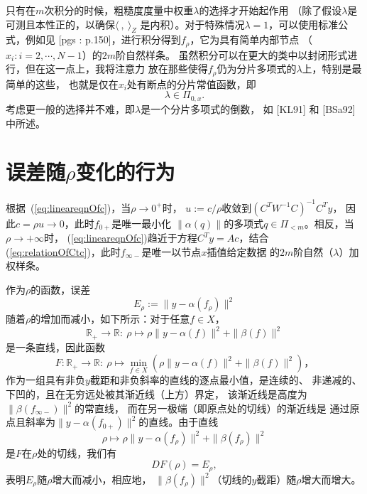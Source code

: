 只有在$m$次积分的时候，粗糙度度量中权重$\lambda$的选择才开始起作用
（除了假设$\lambda$是可测且本性正的，以确保$\langle\ ,\ \rangle_{Z}$
是内积）。对于特殊情况$\lambda=1$，可以使用标准公式，例如见
[pgs : p.150]，进行积分得到$f_{\rho}$，它为具有简单内部节点
（$x_{i}:i=2,\cdots,N-1$）的$2m$阶自然样条。
虽然积分可以在更大的类中以封闭形式进行，但在这一点上，我将注意力
放在那些使得$f_{\rho}$仍为分片多项式的$\lambda$上，特别是最简单的这些，
也就是仅在$x_{i}$处有断点的分片常值函数，即
\begin{equation}
  \label{eq:lambdaInPoly}
  \lambda\in\Pi_{0,x}.
\end{equation}
考虑更一般的选择并不难，即$\lambda$是一个分片多项式的倒数，
如 [KL91] 和 [BSa92] 中所述。

\section{误差随$\rho$变化的行为}
根据~(\ref{eq:lineareqnOfc})，当$\rho\to 0^{+}$时，
$u:=c/\rho$收敛到$(C^{T}W^{-1}C)^{-1}C^{T}y$，
因此$c=\rho u\to 0$，此时$f_{0+}$是唯一最小化
$\|\alpha(q)\|$的多项式$q\in\Pi_{<m}$。相反，当$\rho\to +\infty$时，
(\ref{eq:lineareqnOfc})趋近于方程$C^{T}y=Ac$，结合
(\ref{eq:relationOfCtc})，此时$f_{\infty -}$是唯一以节点$x$插值给定数据
的$2m$阶自然（$\lambda$）加权样条。

作为$\rho$的函数，误差
\begin{displaymath}
  E_{\rho}:=\|y-\alpha(f_{\rho})\|^{2}
\end{displaymath}
随着$\rho$的增加而减小，如下所示：对于任意$f\in X$，
\begin{displaymath}
  \mathbb{R}_{+}\to \mathbb{R}:\
  \rho\mapsto \rho\|y-\alpha(f)\|^{2}+\|\beta(f)\|^{2}
\end{displaymath}
是一条直线，因此函数
\begin{displaymath}
  F:\mathbb{R}_{+}\to \mathbb{R}:\
  \rho\mapsto \min_{f\in X}
  \left( \rho\|y-\alpha(f)\|^{2}+\|\beta(f)\|^{2} \right)，
\end{displaymath}
作为一组具有非负$y$截距和非负斜率的直线的逐点最小值，是连续的、
非递减的、下凹的，且在无穷远处被其渐近线（上方）界定，
该渐近线是高度为$\|\beta(f_{\infty-})\|^{2}$的常直线，
而在另一极端（即原点处的切线）的渐近线是
通过原点且斜率为$\|y-\alpha(f_{0+})\|^{2}$的直线。由于直线
\begin{displaymath}
  \rho\mapsto \rho\|y-\alpha(f_{\rho})\|^{2}+\|\beta(f_{\rho})\|^{2}
\end{displaymath}
是$F$在$\rho$处的切线，我们有
\begin{displaymath}
  DF(\rho)=E_{\rho},
\end{displaymath}
表明$E_{\rho}$随$\rho$增大而减小，相应地，
$\|\beta(f_{\rho})\|^{2}$（切线的$y$截距）随$\rho$增大而增大。

